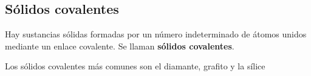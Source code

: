 
\subsection{Sólidos covalentes}\label{subsec:solidos-covalentes}

Hay sustancias sólidas formadas por un número indeterminado de átomos unidos mediante un enlace covalente.
Se llaman \textbf{sólidos covalentes}.

Los sólidos covalentes más comunes son el diamante, grafito y la sílice

